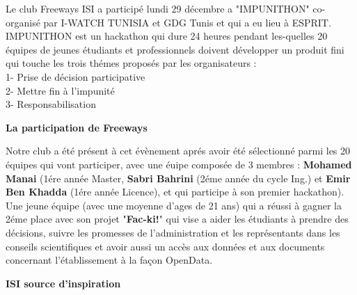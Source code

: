 
\newpage
{}
\vspace*{-30mm}

\begin{multicols}{2}
Le club Freeways ISI a particip\'e lundi 29 d\'ecembre a "IMPUNITHON" co-organis\'e par I-WATCH TUNISIA et GDG Tunis et qui a eu lieu \`a ESPRIT. IMPUNITHON est un hackathon qui dure 24 heures pendant les-quelles 20 \'equipes de jeunes \'etudiants et professionnels doivent d\'evelopper un produit fini qui touche les trois th\'emes propos\'es par les organisateurs :\\
1- Prise de d\'ecision participative \\
2- Mettre fin \`a l'impunit\'e \\
3- Responsabilisation\\

\begin{center}
\textbf{La participation de Freeways}\\
\end{center}

Notre club a \'et\'e pr\'esent \`a cet \'ev\`enement apr\'es avoir \'et\'e s\'electionn\'e parmi les 20 \'equipes qui vont participer, avec une \'euipe compos\'ee de 3 membres :\textbf{ Mohamed Manai} (1\'ere ann\'ee Master, \textbf{Sabri Bahrini} (2\'eme ann\'ee du cycle Ing.) et \textbf{Emir Ben Khadda} (1\'ere ann\'ee Licence), et qui participe \`a son premier hackathon).
Une jeune \'equipe (avec une moyenne d'ages de 21 ans) qui a r\'eussi \`a gagner la 2\'eme place avec son projet "\textbf{Fac-ki!}" qui vise a aider les \'etudiants \`a prendre des d\'ecisions, suivre les promesses de l'administration et les repr\'esentants dans les conseils scientifiques et avoir aussi un acc\`es aux donn\'ees et aux documents concernant l'\'etablissement \`a la fa\c con OpenData.\\

\begin{center}
\textbf{ISI source d'inspiration}\\
\end{center}


\end{multicols}
